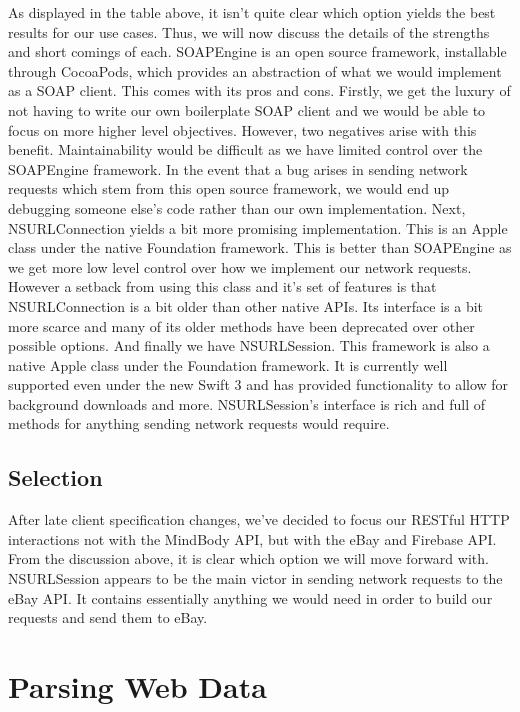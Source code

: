 \documentclass[letterpaper,10pt,titlepage]{article}
\begin{document}
As displayed in the table above, it isn't quite clear which option yields the best results for our use cases. Thus, we will now discuss the details of the strengths and short comings of each. SOAPEngine is an open source framework, installable through CocoaPods, which provides an abstraction of what we would implement as a SOAP client. This comes with its pros and cons. Firstly, we get the luxury of not having to write our own boilerplate SOAP client and we would be able to focus on more higher level objectives. However, two negatives arise with this benefit. Maintainability would be difficult as we have limited control over the SOAPEngine framework. In the event that a bug arises in sending network requests which stem from this open source framework, we would end up debugging someone else's code rather than our own implementation. Next, NSURLConnection yields a bit more promising implementation. This is an Apple class under the native Foundation framework. This is better than SOAPEngine as we get more low level control over how we implement our network requests. However a setback from using this class and it's set of features is that NSURLConnection is a bit older than other native APIs. Its interface is a bit more scarce and many of its older methods have been deprecated over other possible options. And finally we have NSURLSession. This framework is also a native Apple class under the Foundation framework. It is currently well supported even under the new Swift 3 and has provided functionality to allow for background downloads and more. NSURLSession's interface is rich and full of methods for anything sending network requests would require.

\subsection{Selection}

After late client specification changes, we've decided to focus our RESTful HTTP interactions not with the MindBody API, but with the eBay and Firebase API. From the discussion above, it is clear which option we will move forward with. NSURLSession appears to be the main victor in sending network requests to the eBay API. It contains essentially anything we would need in order to build our requests and send them to eBay.

\section{Parsing Web Data}
\end{document}
